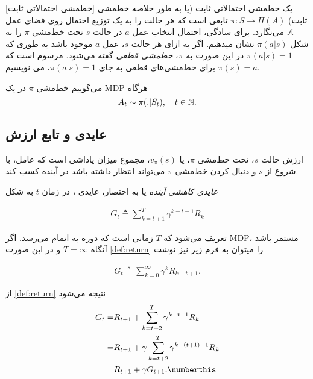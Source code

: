 [خط\nf مشی احتمالاتی ثابت]
یک خط\nf مشی احتمالاتی ثابت (یا به طور خلاصه خط\nf مشی ثابت) 
$\pi: S \to \Pi(A)$
تابعی است که هر حالت را به یک توزیع احتمال روی فضای عمل
$\EuScript{A}$
 می‌نگارد.
برای سادگی، احتمال انتخاب عمل $a$ در حالت $s$ تحت خط‌مشی $\pi$ را به شکل
$\pi(a|s)$
نشان می\nf دهیم.
اگر به ازای هر حالت $s$، عمل $a$ موجود باشد به طوری که 
$\pi(a|s) = 1$
در این صورت به $\pi$،
\textit{
	خط\nf مشی قطعی
}
گفته می‌شود. مرسوم است که برای خط‌مشی‌های قطعی به جای 
$\pi(a|s) = 1$،
می نویسیم
$\pi(s) = a$.


می‌گوییم خط‌مشی $\pi$ در یک
 MDP
  \textit{
  }
   هرگاه
$$A_t \sim \pi(. |S_t),	 \quad t \in \mathbb{N}.$$




\subsection{عایدی و تابع ارزش}

ارزش حالت $s$، تحت خط‌مشی $\pi$، یا
 $v_\pi(s)$،
مجموع میزان پاداشی است که عامل، با شروع از $s$ و دنبال کردن خط‌مشی $\pi$ می‌تواند انتظار داشته باشد در آینده کسب کند.

\textit{عایدی کاهشی آینده}
 یا به اختصار، عایدی ، در زمان $t$ به شکل

\begin{align}
G_t \triangleq \sum_{k=t+1}^{T} \gamma^{k-t-1} R_{k}
\label{def:return}
\end{align}

تعریف می‌شود که $T$ زمانی است که دوره به اتمام می‌رسد. اگر MDP، مستمر باشد آنگاه 
$T=\infty$ و
در این صورت 
\ref{def:return}
 را می\nf توان به فرم زیر نیز نوشت
 
\begin{align}
	G_t \triangleq \sum_{k=0}^{\infty} \gamma^{k} R_{k+t+1}.
	\label{def:returninf}
\end{align}
 

از
 \ref{def:return}
  نتیجه می‌شود \cite{suttonbook}
\begin{align}
G_t =& R_{t+1} + \sum_{k=t+2}^{T} \gamma^{k-t-1} R_{k} \nonumber \\
=& R_{t+1} + \gamma \sum_{k=t+2}^{T} \gamma^{k - (t+1) - 1} R_{k} \nonumber \\
=& R_{t+1} + \gamma G_{t+1}. \numberthis
\label{eq:returnres}
\end{align}


